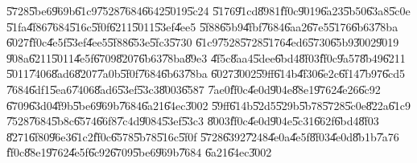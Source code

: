 \documentclass[12pt,a4paper]{article}
\begin{document}
\U{5728}\U{5be6}\U{969b}\U{61c9}\U{7528}\U{7684}\U{6642}\U{5019}\U{5c24}%
\U{5176}\U{91cd}\U{8981}\U{ff0c}\U{9019}\U{6a23}\U{5b50}\U{63a8}\U{5c0e}%
\U{51fa}\U{4f86}\U{7684}\U{516c}\U{5f0f}\U{6211}\U{5011}\U{53ef}\U{4ee5}%
\U{5f88}\U{65b9}\U{4fbf}\U{7684}\U{6aa2}\U{67e5}\U{5176}\U{6b63}\U{78ba}%
\U{6027}\U{ff0c}\U{4e5f}\U{53ef}\U{4ee5}\U{5f88}\U{653e}\U{5fc3}\U{5730}%
\U{61c9}\U{7528}\U{5728}\U{5176}\U{4ed6}\U{5730}\U{65b9}\U{3002}\U{9019}%
\U{908a}\U{6211}\U{5011}\U{4e5f}\U{6709}\U{8207}\U{6b63}\U{78ba}\U{89e3}%
\U{4f5c}\U{8aa4}\U{5dee}\U{6bd4}\U{8f03}\U{ff0c}\U{9a57}\U{8b49}\U{6211}%
\U{5011}\U{7406}\U{8ad6}\U{8207}\U{7a0b}\U{5f0f}\U{7684}\U{6b63}\U{78ba}%
\U{6027}\U{3002}\U{59ff}\U{614b}\U{4f30}\U{6e2c}\U{6f14}\U{7b97}\U{6cd5}%
\U{7684}\U{6df1}\U{5ea6}\U{7406}\U{8ad6}\U{53ef}\U{53c3}\U{8003}\U{6587}%
\U{7ae0}\cite{savage}\U{ff0c}\U{4e0d}\U{904e}\U{88e1}\U{9762}\U{4e26}\U{6c92}%
\U{6709}\U{63d0}\U{4f9b}\U{5be6}\U{969b}\U{7684}\U{6a21}\U{64ec}\U{3002}%
\U{59ff}\U{614b}\U{52d5}\U{529b}\U{5b78}\U{5728}\U{5c0e}\U{822a}\U{61c9}%
\U{7528}\U{7684}\U{5b8c}\U{6574}\U{66f8}\U{7c4d}\U{9084}\U{53ef}\U{53c3}%
\U{8003}\cite{bekir}\U{ff0c}\U{4e0d}\U{904e}\U{5c31}\U{662f}\U{6bd4}\U{8f03}%
\U{8271}\U{6f80}\U{96e3}\U{61c2}\U{ff0c}\U{6578}\U{5b78}\U{516c}\U{5f0f}%
\U{5728}\U{6392}\U{7248}\U{4e0a}\U{4e5f}\U{8f03}\U{4e0d}\U{8b1b}\U{7a76}%
\U{ff0c}\U{88e1}\U{9762}\U{4e5f}\U{6c92}\U{6709}\U{5be6}\U{969b}\U{7684}%
\U{6a21}\U{64ec}\U{3002}

\bigskip
\end{document}

